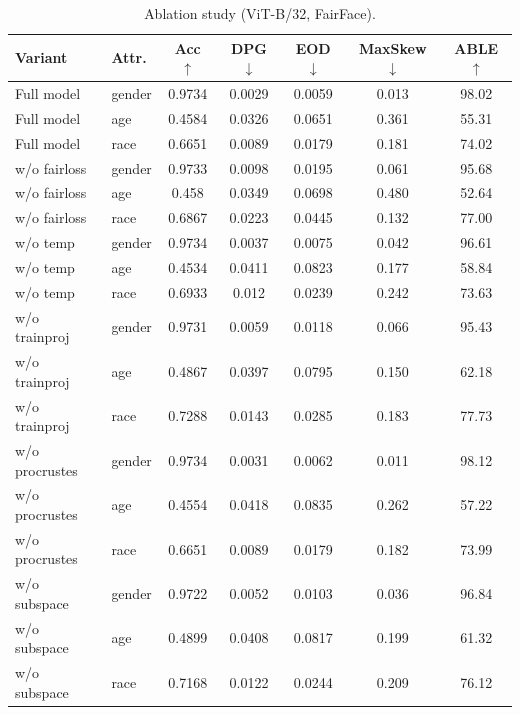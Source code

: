 \begin{table}[t]\centering\small
\caption{Ablation study (ViT-B/32, FairFace).}
\begin{tabular}{llccccc}\toprule
Variant & Attr. & Acc $\uparrow$ & DPG $\downarrow$ & EOD $\downarrow$ & MaxSkew $\downarrow$ & ABLE $\uparrow$\\\midrule
Full model & gender & 0.9734 & 0.0029 & 0.0059 & 0.013 & 98.02\\
Full model & age & 0.4584 & 0.0326 & 0.0651 & 0.361 & 55.31\\
Full model & race & 0.6651 & 0.0089 & 0.0179 & 0.181 & 74.02\\
w/o fairloss & gender & 0.9733 & 0.0098 & 0.0195 & 0.061 & 95.68\\
w/o fairloss & age & 0.458 & 0.0349 & 0.0698 & 0.480 & 52.64\\
w/o fairloss & race & 0.6867 & 0.0223 & 0.0445 & 0.132 & 77.00\\
w/o temp & gender & 0.9734 & 0.0037 & 0.0075 & 0.042 & 96.61\\
w/o temp & age & 0.4534 & 0.0411 & 0.0823 & 0.177 & 58.84\\
w/o temp & race & 0.6933 & 0.012 & 0.0239 & 0.242 & 73.63\\
w/o trainproj & gender & 0.9731 & 0.0059 & 0.0118 & 0.066 & 95.43\\
w/o trainproj & age & 0.4867 & 0.0397 & 0.0795 & 0.150 & 62.18\\
w/o trainproj & race & 0.7288 & 0.0143 & 0.0285 & 0.183 & 77.73\\
w/o procrustes & gender & 0.9734 & 0.0031 & 0.0062 & 0.011 & 98.12\\
w/o procrustes & age & 0.4554 & 0.0418 & 0.0835 & 0.262 & 57.22\\
w/o procrustes & race & 0.6651 & 0.0089 & 0.0179 & 0.182 & 73.99\\
w/o subspace & gender & 0.9722 & 0.0052 & 0.0103 & 0.036 & 96.84\\
w/o subspace & age & 0.4899 & 0.0408 & 0.0817 & 0.199 & 61.32\\
w/o subspace & race & 0.7168 & 0.0122 & 0.0244 & 0.209 & 76.12\\
\bottomrule\end{tabular}\end{table}